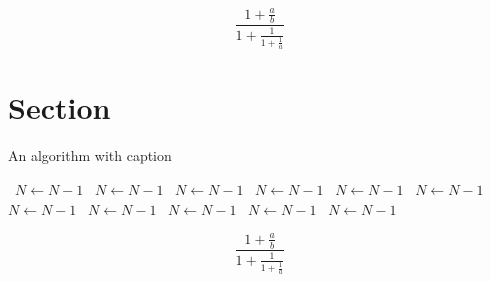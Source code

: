 \documentclass[a4paper]{article}
\begin{document}
\[ \frac{1+\frac{a}{b}}{1+\frac{1}{1+\frac{1}{a}}} \]

\section{Section}

\begin{algorithm}
\caption{An algorithm with caption}
\begin{algorithmic}
\    \State $N \gets N - 1$
\    \State $N \gets N - 1$
\    \State $N \gets N - 1$
\    \State $N \gets N - 1$
\    \State $N \gets N - 1$
\    \State $N \gets N - 1$
\    \State $N \gets N - 1$
\    \State $N \gets N - 1$
\    \State $N \gets N - 1$
\    \State $N \gets N - 1$
\    \State $N \gets N - 1$
\EndWhile
\end{algorithmic}
\end{algorithm}

\[ \frac{1+\frac{a}{b}}{1+\frac{1}{1+\frac{1}{a}}} \]
\end{document}
